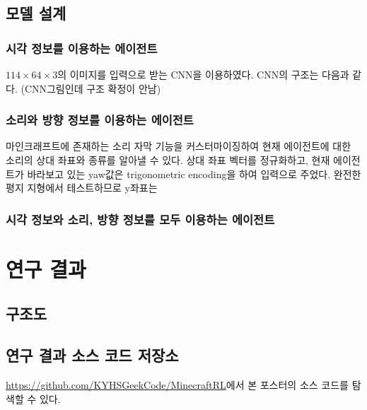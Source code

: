 \documentclass{tudelftposter}
\begin{document}
\subsection{모델 설계}
\subsubsection{시각 정보를 이용하는 에이전트}
$114 \times 64 \times 3$의 이미지를 입력으로 받는 CNN을 이용하였다. CNN의 구조는 다음과 같다.
(CNN그림인데 구조 확정이 안남)
\subsubsection{소리와 방향 정보를 이용하는 에이전트}
마인크래프트에 존재하는 소리 자막 기능을 커스터마이징하여 현재 에이전트에 대한 소리의 상대 좌표와 종류를 알아낼 수 있다. 상대 좌표 벡터를 정규화하고, 현재 에이전트가 바라보고 있는 yaw값은 trigonometric encoding을 하여 입력으로 주었다. 완전한 평지 지형에서 테스트하므로 y좌표는


\subsubsection{시각 정보와 소리, 방향 정보를 모두 이용하는 에이전트}



\section{연구 결과}

\subsection{구조도}



\subsection{연구 결과 소스 코드 저장소}
\href{https://github.com/KYHSGeekCode/MinecraftRL}{https://github.com/KYHSGeekCode/MinecraftRL}에서 본 포스터의 소스 코드를 탐색할 수 있다.
\end{document}
